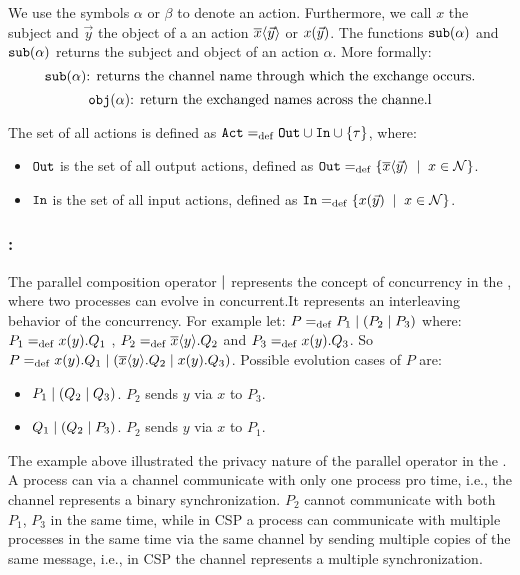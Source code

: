 We use the symbols $\alpha$ or $\beta$ to denote an action. Furthermore, we call $x$ the subject and $\vec{y}$ the object of a an action $\overline{x}\langle\vec{y}\rangle$ or $x(\vec{y})$. The functions  $\mathtt{sub}(\alpha)$ and $\mathtt{sub}(\alpha)$ returns the subject and object of an action $\alpha$. More formally:
\[\mathtt{sub}(\alpha) \text{: returns the channel name through which the exchange occurs.}\]
\[\mathtt{obj}(\alpha) \text{: return the exchanged names across the channe.l}\]

The set of all actions is defined as $\actions\define\outA\cup\inA\cup\set{\tau}$, where:
\begin{itemize}
\item $\mathtt{Out}$ is the set of all output actions, defined as $\outA\define\set[x\in\names]{\out{x}{\vec{y}}}$.
\item $\mathtt{In}$ is the set of all input actions, defined as $\inA\define\set[x\in\names]{\inp{x}{\vec{y}}}$.
\end{itemize}
\subsubsection{:}
The parallel composition operator $\mid$ represents the concept of concurrency in the \picalc{}, where two processes can evolve in concurrent.It represents an interleaving behavior of the concurrency.
For example let:  $P=_{\mathrm{def}}P_1 \mid (P_2 \mid P_3)$ where: $P_1=_{\mathrm{def}}x(y).Q_1$ , $P_2=_{\mathrm{def}}\overline{x}\langle y\rangle.Q_2$ and $P_3=_{\mathrm{def}}x(y).Q_3$. So $P=_{\mathrm{def}}x(y).Q_1 \mid (\overline{x}\langle y\rangle.Q_2 \mid x(y).Q_3)$.
Possible evolution cases of $P$ are:
\begin{itemize}
\item $P_1 \mid (Q_2 \mid Q_3)$. $P_2$ sends $y$ via $x$ to $P_3$.
\item $Q_1 \mid (Q_2 \mid P_3)$. $P_2$ sends $y$ via $x$ to $P_1$.
\end{itemize}

The example above illustrated the privacy nature of the parallel operator in the \picalc{}. A process can via a channel communicate with only one process pro time, i.e., the channel represents a binary synchronization. $P_2$ cannot communicate with both $P_1$, $P_3$ in the same time, while in \gls{CSP} a process can communicate with multiple processes in the same time via the same channel by sending multiple copies of the same message, i.e., in CSP the channel represents a multiple synchronization.


